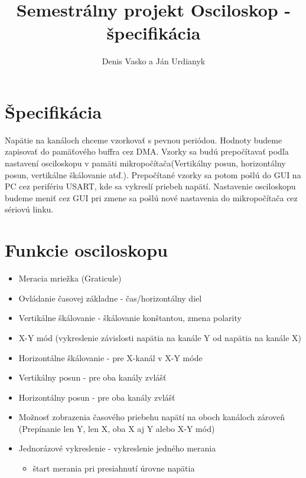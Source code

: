 \documentclass{article}
\begin{document}
	\title{ Semestrálny projekt Osciloskop - špecifikácia }
	\author{Denis Vasko a Ján Urdianyk} 
	\maketitle
	\thispagestyle{empty}
	\section{Špecifikácia}
	Napätie na kanáloch chceme vzorkovať s pevnou periódou. Hodnoty budeme zapisovať do pamäťového buffra cez DMA. Vzorky sa budú prepočítavať podľa nastavení osciloskopu v pamäti mikropočítača(Vertikálny posun, horizontálny posun, vertikálne škálovanie atď.). Prepočítané vzorky sa potom pošlú do GUI na PC cez perifériu USART, kde sa vykreslí priebeh napätí. Nastavenie osciloskopu budeme meniť cez GUI pri zmene sa pošlú nové nastavenia do mikropočítača cez sériovú linku.
\section{Funkcie osciloskopu}
\begin{itemize}
	\item Meracia mriežka (Graticule) 
	\item Ovládanie časovej základne - čas/horizontálny diel
	\item Vertikálne škálovanie - škálovanie konštantou, zmena polarity
	\item X-Y mód (vykreslenie závislosti napätia na kanále Y od napätia na kanále X)
	\item Horizontálne škálovanie - pre X-kanál v X-Y móde
	\item Vertikálny posun - pre oba kanály zvlášť
	\item Horizontálny posun - pre oba kanály zvlášť
	\item Možnosť zobrazenia časového priebehu napätí na oboch kanáloch zároveň (Prepínanie len Y, len X, oba X aj Y alebo X-Y mód)
	\item Jednorázové vykreslenie - vykreslenie jedného merania 
	\begin{itemize}
		\item štart merania pri presiahnutí úrovne napätia
	\end{itemize}
\end{itemize} 
\end{document}
